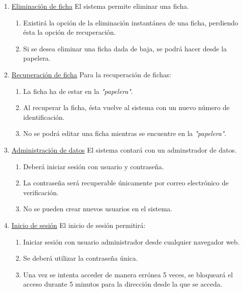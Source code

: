 \documentclass[10pt,a4paper]{article}
\begin{document}
\begin{enumerate}[label=RF\arabic*. ,leftmargin=2.8\parindent]
	\bigskip
	\item \underline{Eliminación de ficha}
	\newline \newline
	El sistema permite eliminar una ficha.
	\begin{enumerate}[label=-]
		\item Existirá la opción de la eliminación instantánea de una ficha, perdiendo ésta la opción de recuperación.
		\item Si se desea eliminar una ficha dada de baja, se podrá hacer desde la papelera.
	\end{enumerate}

	\bigskip
	\item \underline{Recuperación de ficha}
	\newline \newline
	Para la recuperación de fichas:
	\begin{enumerate}[label=-]
	\item La ficha ha de estar en la \textit{"papelera"}.
	\item Al recuperar la ficha, ésta vuelve al sistema con un nuevo número de identificación.
	\item No se podrá editar una ficha mientras se encuentre en la \textit{"papelera"}.
	\end{enumerate}

	\bigskip
	\item \underline{Administración de datos}
	\newline \newline
	El sistema contará con un adminstrador de datos.
	\begin{enumerate}[label=-]
		\item Deberá iniciar sesión con usuario y contraseña.
		\item La contraseña será recuperable únicamente por correo electrónico de verificación.
		\item No se pueden crear nuevos usuarios en el sistema.
		
	\end{enumerate}

	\bigskip
	\item \underline{Inicio de sesión}
	\newline \newline
	El inicio de sesión permitirá:
	\begin{enumerate}[label=-]
		\item Iniciar sesión con usuario administrador desde cualquier navegador web.
		\item Se deberá utilizar la contraseña única.
		\item Una vez se intenta acceder de manera errónea 5 veces, se bloqueará el acceso durante 5 minutos para la dirección desde la que se acceda.
	\end{enumerate}



\end{enumerate}
\end{document}
